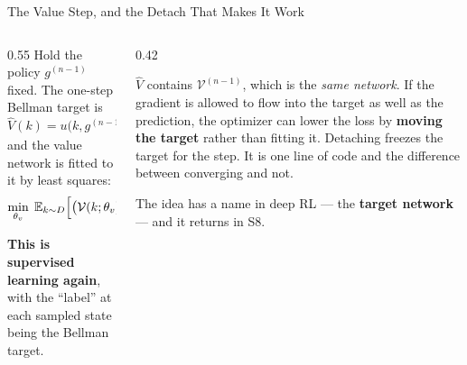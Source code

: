 \begin{frame}{The Value Step, and the Detach That Makes It Work}
\begin{columns}[T]
\begin{column}{0.55\textwidth}
\small
Hold the policy $g^{(n-1)}$ fixed. The one-step Bellman target is
\[
  \hat V(k)=u\bigl(k,g^{(n-1)}(k)\bigr)+\beta\,\mathcal{V}^{(n-1)}\bigl(f(k,g^{(n-1)}(k))\bigr),
\]
and the value network is fitted to it by least squares:
\[
  \min_{\theta_v}\;\mathbb{E}_{k\sim D}\Bigl[\bigl(\mathcal{V}(k;\theta_v)-\hat V(k)\bigr)^{2}\Bigr].
\]
\medskip

\textbf{This is supervised learning again}, with the ``label'' at each sampled state being the Bellman target.
\end{column}
\begin{column}{0.42\textwidth}
\begin{cautionbox}[title=\textbf{\texttt{detach()} the target}]\small
$\hat V$ contains $\mathcal{V}^{(n-1)}$, which is the \emph{same network}. If the gradient is allowed to flow into the target as well as the prediction, the optimizer can lower the loss by \textbf{moving the target} rather than fitting it.
\medskip
Detaching freezes the target for the step. It is one line of code and the difference between converging and not.
\end{cautionbox}
\medskip
\begin{examplebox}\footnotesize
The idea has a name in deep RL --- the \textbf{target network} --- and it returns in S8.
\end{examplebox}
\end{column}
\end{columns}
\end{frame}

